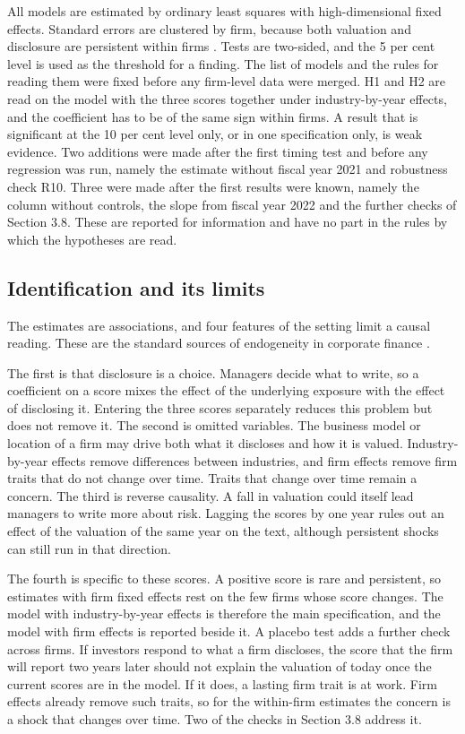\documentclass[12pt,a4paper]{article}
\begin{document}
All models are estimated by ordinary least squares with high-dimensional fixed effects. Standard errors are clustered by firm, because both valuation and disclosure are persistent within firms \citep{petersen2009}. Tests are two-sided, and the 5 per cent level is used as the threshold for a finding. The list of models and the rules for reading them were fixed before any firm-level data were merged. H1 and H2 are read on the model with the three scores together under industry-by-year effects, and the coefficient has to be of the same sign within firms. A result that is significant at the 10 per cent level only, or in one specification only, is weak evidence. Two additions were made after the first timing test and before any regression was run, namely the estimate without fiscal year 2021 and robustness check R10. Three were made after the first results were known, namely the column without controls, the slope from fiscal year 2022 and the further checks of Section 3.8. These are reported for information and have no part in the rules by which the hypotheses are read.

\subsection{Identification and its limits}

The estimates are associations, and four features of the setting limit a causal reading. These are the standard sources of endogeneity in corporate finance \citep{roberts2013}.

The first is that disclosure is a choice. Managers decide what to write, so a coefficient on a score mixes the effect of the underlying exposure with the effect of disclosing it. Entering the three scores separately reduces this problem but does not remove it. The second is omitted variables. The business model or location of a firm may drive both what it discloses and how it is valued. Industry-by-year effects remove differences between industries, and firm effects remove firm traits that do not change over time. Traits that change over time remain a concern. The third is reverse causality. A fall in valuation could itself lead managers to write more about risk. Lagging the scores by one year rules out an effect of the valuation of the same year on the text, although persistent shocks can still run in that direction.

The fourth is specific to these scores. A positive score is rare and persistent, so estimates with firm fixed effects rest on the few firms whose score changes. The model with industry-by-year effects is therefore the main specification, and the model with firm effects is reported beside it. A placebo test adds a further check across firms. If investors respond to what a firm discloses, the score that the firm will report two years later should not explain the valuation of today once the current scores are in the model. If it does, a lasting firm trait is at work. Firm effects already remove such traits, so for the within-firm estimates the concern is a shock that changes over time. Two of the checks in Section 3.8 address it.
\end{document}
